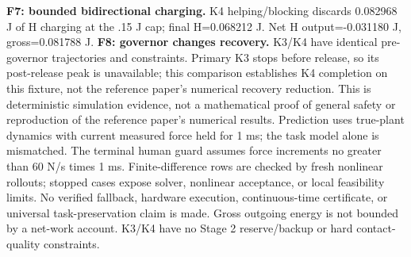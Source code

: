 \documentclass[10pt,letterpaper]{article}
\begin{document}
\textbf{F7: bounded bidirectional charging.} K4 helping/blocking discards 0.082968 J of H charging at the .15 J cap; final H=0.068212 J. Net H output=-0.031180 J, gross=0.081788 J.
\textbf{F8: governor changes recovery.} K3/K4 have identical pre-governor trajectories and constraints. Primary K3 stops before release, so its post-release peak is unavailable; this comparison establishes K4 completion on this fixture, not the reference paper's numerical recovery reduction.
This is deterministic simulation evidence, not a mathematical proof of general safety or reproduction of the reference paper's numerical results. Prediction uses true-plant dynamics with current measured force held for 1 ms; the task model alone is mismatched. The terminal human guard assumes force increments no greater than 60 N/s times 1 ms. Finite-difference rows are checked by fresh nonlinear rollouts; stopped cases expose solver, nonlinear acceptance, or local feasibility limits. No verified fallback, hardware execution, continuous-time certificate, or universal task-preservation claim is made. Gross outgoing energy is not bounded by a net-work account. K3/K4 have no Stage 2 reserve/backup or hard contact-quality constraints.
\end{document}
